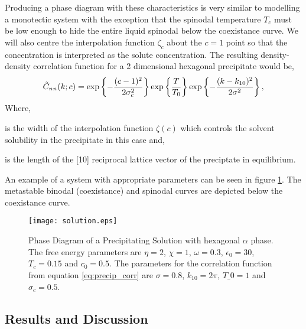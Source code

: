 
Producing a phase diagram with these characteristics is very similar to
modelling a monotectic system with the exception that the spinodal temperature
$T_c$ must be low enough to hide the entire liquid spinodal below the
coexistance curve.  We will also centre the interpolation function $\zeta_c$
about the $c = 1$ point so that the concentration is interpreted as the solute
concentration. The resulting density-density correlation function for a 2
dimensional hexagonal precipitate would be,
%
\begin{equation}
    \label{eq:precip_corr}
    \tilde{C}_{nn}(k; c) = \exp\left\lbrace - \frac{(c - 1)^2}{2\sigma_c^2}\right\rbrace
        \exp\left\lbrace \frac{T}{T_0} \right\rbrace 
        \exp\left\lbrace - \frac{(k - k_{10})^2}{2\sigma^2} \right\rbrace,
\end{equation}
%
Where,
\begin{description}[labelwidth=1cm, align=right]
    \item[$\sigma_c$] is the width of the interpolation function $\zeta(c)$
        which controls the solvent solubility in the precipitate in this case
        and,
    \item[$k_{10}$] is the length of the [10] reciprocal lattice vector of the
        preciptate in equilibrium.
\end{description}

An example of a system with appropriate parameters can be seen in figure
\ref{fig:precip_phase_dia}. The metastable binodal (coexistance) and spinodal
curves are depicted below the coexistance curve.

\begin{figure}
    \centering	
    \texttt{[image: solution.eps]}
    \caption[Coexistance Phase Diagram with Metastable Spinodal]{
        \label{fig:precip_phase_dia} Phase Diagram of a Precipitating Solution
        with hexagonal $\alpha$ phase. The free energy parameters are $\eta =
        2$, $\chi = 1$, $\omega=0.3$, $\epsilon_0=30$, $T_c = 0.15$ and
        $c_0=0.5$. The parameters for the correlation function from equation
        \ref{eq:precip_corr} are $\sigma = 0.8$, $k_{10} = 2\pi$, $T\_0 = 1$
        and $\sigma_c = 0.5$.
    }
\end{figure}

\subsection{Results and Discussion} %

